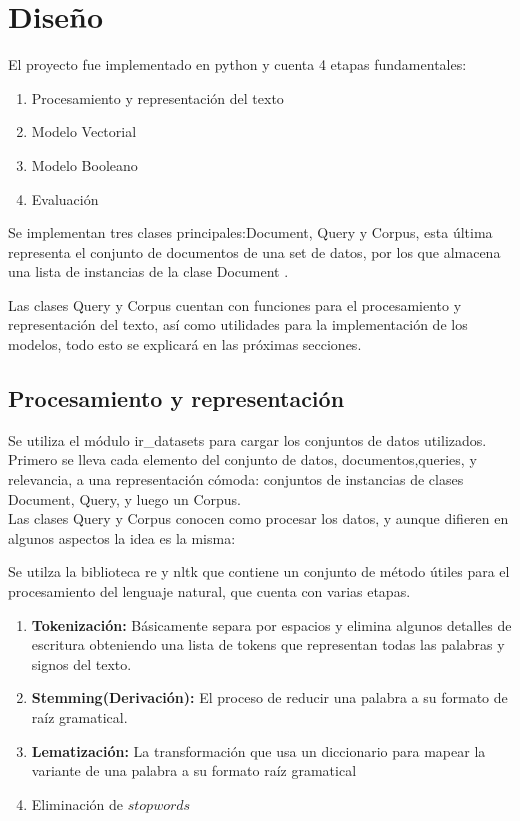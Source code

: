 \documentclass[runningheads,a4paper]{llncs}
\begin{document}
\section{Dise\~no}
El proyecto fue implementado en python y cuenta 4 etapas fundamentales:
\begin{enumerate}

\item Procesamiento y representaci\'on del texto
\item Modelo Vectorial
\item Modelo Booleano
\item Evaluaci\'on
\end{enumerate}

Se implementan tres clases principales:\textsf{Document}, \textsf{Query} y \textsf{Corpus}, esta \'ultima representa el conjunto de documentos de una set de datos, por los que almacena una lista de instancias de la clase \textsf{Document} .

Las clases \textsf{Query} y \textsf{Corpus} cuentan con funciones para el procesamiento y representaci\'on del texto, as\'i como utilidades para la implementaci\'on de los modelos, todo esto se explicar\'a en las pr\'oximas secciones.

\subsection{Procesamiento y representaci\'on}
Se utiliza el m\'odulo  \textsf{ir\_datasets} para cargar los conjuntos de datos utilizados.
Primero se lleva cada elemento del conjunto de datos, documentos,queries, y relevancia, a una representaci\'on c\'omoda: conjuntos de instancias de clases \textsf{Document}, \textsf{Query}, y luego un \textsf{Corpus}.\\


Las clases  \textsf{Query} y \textsf{Corpus} conocen como procesar los datos, y aunque difieren en algunos aspectos la idea es la misma:


Se utilza la biblioteca \textsf{re} y \textsf{nltk} que contiene un conjunto de m\'etodo \'utiles para el procesamiento del lenguaje natural, que cuenta con varias etapas.
\begin{enumerate}
\item \textbf{Tokenizaci\'on:} B\'asicamente separa por espacios y elimina algunos detalles de escritura obteniendo una lista de tokens que representan todas las palabras y signos del texto.
\item \textbf{Stemming(Derivaci\'on):} El proceso de reducir una palabra a su formato de ra\'iz gramatical.
\item \textbf{Lematizaci\'on:} La transformaci\'on que usa un diccionario para mapear la variante de una palabra a su formato ra\'iz gramatical
\item Eliminaci\'on de $stopwords$
\end{enumerate} 
\end{document}

